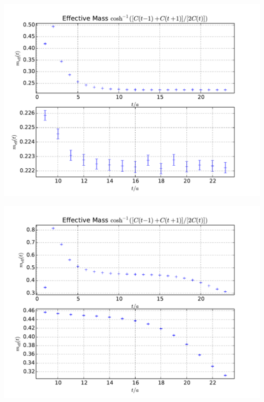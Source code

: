 \documentclass[english, fleqn]{beamer}
\begin{document}
\begin{frame}
    \begin{centering}
        \includegraphics[height=\textheight]{plots/A100_24_L24_T48_beta190_mul0100_musig150_mudel190_kappa1632550__ev120__TB2_SO_LI6_new_c2_m_eff.pdf}
    \end{centering}
\end{frame}

\begin{frame}
    \begin{centering}
        \includegraphics[height=\textheight]{plots/A100_24_L24_T48_beta190_mul0100_musig150_mudel190_kappa1632550__ev120__TB2_SO_LI6_new_c4_m_eff.pdf}
    \end{centering}
\end{frame}
\end{document}
